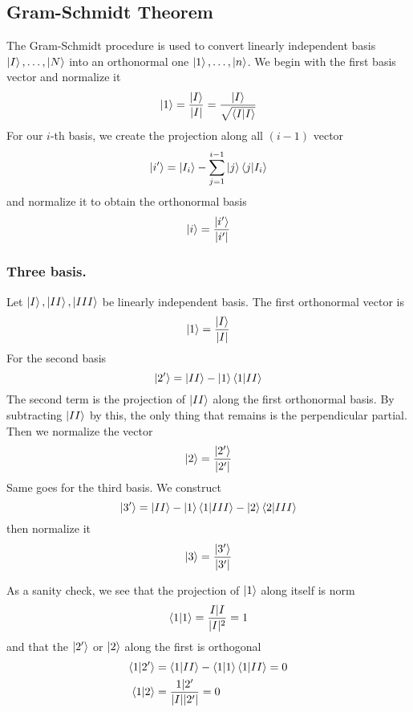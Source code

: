 \documentclass[../main.tex]{subfiles}
\begin{document}
\subsection*{Gram-Schmidt Theorem}
The Gram-Schmidt procedure is used to convert linearly independent basis $\ket{I},\dots,\ket{N}$ into an orthonormal one $\ket{1},\dots,\ket{n}$.
We begin with the first basis vector and normalize it
\begin{equation*}
	\ket{1}=\frac{\ket{I}}{|I|}=\frac{\ket{I}}{\sqrt{\braket{I|I}}}
\end{equation*}
For our $i$-th basis, we create the projection along all $(i-1)$ vector
\begin{equation*}
	\ket{i'}=\ket{I_i}-\sum_{j=1}^{i-1}\ket{j}\braket{j|I_i}
\end{equation*}
and normalize it to obtain the orthonormal basis
\begin{equation*}
	\ket{i}=\frac{\ket{i'}}{|i'|}
\end{equation*}

\subsubsection*{Three basis.}
Let $\ket{I}, \ket{II}, \ket{III}$ be linearly independent basis.
The first orthonormal vector is
\begin{equation*}
	\ket{1}=\frac{\ket{I}}{|I|}
\end{equation*}
For the second basis
\begin{equation*}
	\ket{2'}=\ket{II}-\ket{1}\braket{1|II}
\end{equation*}
The second term is the projection of $\ket{II}$ along the first orthonormal basis.
By subtracting $\ket{II}$ by this, the only thing that remains is the perpendicular partial.
Then we normalize the vector
\begin{equation*}
	\ket{2}=\frac{\ket{2'}}{|2'|}
\end{equation*}
Same goes for the third basis.
We construct
\begin{equation*}
	\ket{3'} =\ket{II}-\ket{1}\braket{1|III}-\ket{2}\braket{2|III}
\end{equation*}
then normalize it
\begin{equation*}
	\ket{3}=\frac{\ket{3'}}{|3'|}
\end{equation*}

As a sanity check, we see that the projection of $\ket{1}$ along itself is norm
\begin{equation*}
	\braket{1|1}=\frac{I|I }{|I|^2}=1
\end{equation*}
and that the $\ket{2'}$ or $\ket{2}$ along the first is orthogonal
\begin{align*}
	\braket{1|2'} & =\braket{1|II}-\braket{1|1}\braket{1|II}=0 \\
	\braket{1|2}  & =\frac{1|2'}{|I||2'|}=0
\end{align*}
\end{document}
